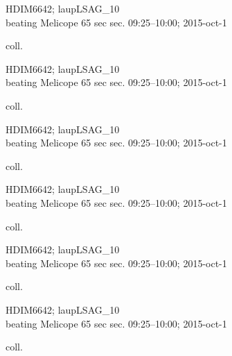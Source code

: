 \documentclass[2pt]{extarticle}
\begin{document}
\noindent
\parbox{0.16\textwidth}{\tiny \raggedright \rule[-0.3\baselineskip]{0pt}{10pt}HDIM6642; laupLSAG\_10\\ beating Melicope 65 sec sec. 09:25--10:00; 2015-oct-1\\ \rule{0ex}{0ex}\hspace{6em} coll.}
\parbox{0.16\textwidth}{\tiny \raggedright \rule[-0.3\baselineskip]{0pt}{10pt}HDIM6642; laupLSAG\_10\\ beating Melicope 65 sec sec. 09:25--10:00; 2015-oct-1\\ \rule{0ex}{0ex}\hspace{6em} coll.}
\parbox{0.16\textwidth}{\tiny \raggedright \rule[-0.3\baselineskip]{0pt}{10pt}HDIM6642; laupLSAG\_10\\ beating Melicope 65 sec sec. 09:25--10:00; 2015-oct-1\\ \rule{0ex}{0ex}\hspace{6em} coll.}
\parbox{0.16\textwidth}{\tiny \raggedright \rule[-0.3\baselineskip]{0pt}{10pt}HDIM6642; laupLSAG\_10\\ beating Melicope 65 sec sec. 09:25--10:00; 2015-oct-1\\ \rule{0ex}{0ex}\hspace{6em} coll.}
\parbox{0.16\textwidth}{\tiny \raggedright \rule[-0.3\baselineskip]{0pt}{10pt}HDIM6642; laupLSAG\_10\\ beating Melicope 65 sec sec. 09:25--10:00; 2015-oct-1\\ \rule{0ex}{0ex}\hspace{6em} coll.}
\parbox{0.16\textwidth}{\tiny \raggedright \rule[-0.3\baselineskip]{0pt}{10pt}HDIM6642; laupLSAG\_10\\ beating Melicope 65 sec sec. 09:25--10:00; 2015-oct-1\\ \rule{0ex}{0ex}\hspace{6em} coll.} \\ 
\vspace{0.001in} 
\end{document}
